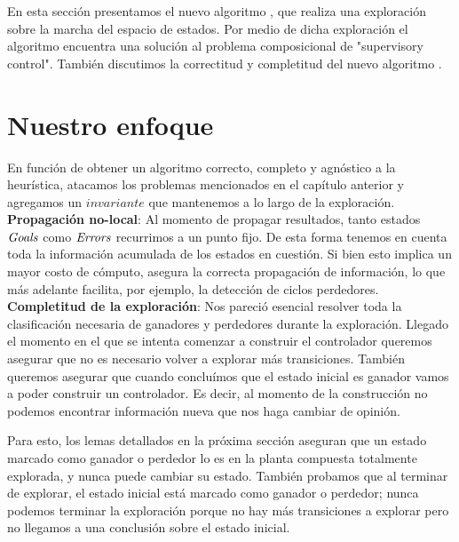 
En esta sección presentamos el nuevo algoritmo \DCS, que realiza una exploración sobre la marcha del espacio de estados. Por medio de dicha exploración el algoritmo encuentra una solución al problema composicional de "supervisory control". También discutimos la correctitud y completitud del nuevo algoritmo \DCS. \\

\section{Nuestro enfoque}

En función de obtener un algoritmo correcto, completo y agnóstico a la heurística, atacamos los problemas mencionados en el capítulo anterior y agregamos un $invariante$ que mantenemos a lo largo de la exploración.\\

\textbf{Propagación no-local}: Al momento de propagar resultados, tanto estados $\mathit{Goals}$ como $\mathit{Errors}$ recurrimos a un punto fijo. De esta forma tenemos en cuenta toda la información acumulada de los estados en cuestión. Si bien esto implica un mayor costo de cómputo, asegura la correcta propagación de información, lo que más adelante facilita, por ejemplo, la detección de ciclos perdedores.\\

\textbf{Completitud de la exploración}: Nos pareció esencial resolver toda la clasificación necesaria de ganadores y perdedores durante la exploración. Llegado el momento en el que se intenta comenzar a construir el controlador queremos asegurar que no es necesario volver a explorar más transiciones. También queremos asegurar que cuando concluímos que el estado inicial es ganador vamos a poder construir un controlador. Es decir, al momento de la construcción no podemos encontrar información nueva que nos haga cambiar de opinión.

Para esto, los lemas detallados en la próxima sección aseguran que un estado marcado como ganador o perdedor lo es en la planta compuesta totalmente explorada, y nunca puede cambiar su estado. También probamos que al terminar de explorar, el estado inicial está marcado como ganador o perdedor; nunca podemos terminar la exploración porque no hay más transiciones a explorar pero no llegamos a una conclusión sobre el estado inicial.\\

